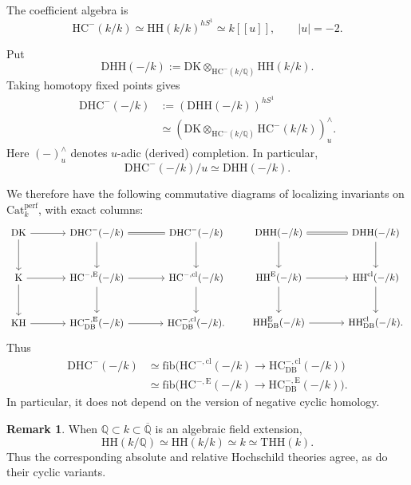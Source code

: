 \documentclass{amsart}
\theoremstyle{plain}
\theoremstyle{definition}
\newtheorem{remark}[prop]{Remark}
\newcommand{\bbQ}{\mathbb{Q}}
\newcommand{\Catperf}{\mathrm{Cat}^{\mathrm{perf}}}
\newcommand{\HH}{\mathrm{HH}}
\newcommand{\HC}{\mathrm{HC}}
\newcommand{\fib}{\mathrm{fib}}
\newcommand{\K}{\mathrm{K}}
\newcommand{\KH}{\mathrm{KH}}
\newcommand{\DK}{\mathrm{DK}}
\newcommand{\THH}{\mathrm{THH}}
\newcommand{\DHH}{\mathrm{DHH}}
\newcommand{\DHC}{\mathrm{DHC}}
\newcommand{\DB}{\mathrm{DB}}
\newcommand{\cl}{\mathrm{cl}}
\begin{document}
The coefficient algebra is
\[
\HC^-(k/k)\simeq \HH(k/k)^{hS^1}\simeq k[[u]],
\qquad |u|=-2.
\]


Put
\[
\DHH(-/k):=\DK\otimes_{\HC^-(k/\bbQ)}\HH(k/k).
\]
Taking homotopy fixed points gives
\begin{equation}\label{DHCcompletion}
\begin{aligned}
\DHC^-(-/k)
&:=(\DHH(-/k))^{hS^1}\\
&\simeq
(
\DK\otimes_{\HC^-(k/\bbQ)}\HC^-(k/k)
)^\wedge_u.
\end{aligned}
\end{equation}
Here $(-)^\wedge_u$ denotes $u$-adic (derived) completion. In particular,
\[
\DHC^-(-/k)/u\simeq \DHH(-/k).
\]

We therefore have the following commutative diagrams of localizing invariants on $\Catperf_k$, with exact columns:
\begin{equation}\label{negativecycliccorrectiondiagram}
\begin{gathered}
\begin{tikzcd}[column sep=large,row sep=large]
\DK\arrow[r]\arrow[d]
 &\DHC^-(-/k)\arrow[r,equal]\arrow[d]
 &\DHC^-(-/k)\arrow[d]\\
\K\arrow[r]\arrow[d]
 &\HC^{-,\mathrm{E}}(-/k)\arrow[r]\arrow[d]
 &\HC^{-,\cl}(-/k)\arrow[d]\\
\KH\arrow[r]
 &\HC^{-,\mathrm{E}}_{\DB}(-/k)\arrow[r]
 &\HC^{-,\cl}_{\DB}(-/k).
\end{tikzcd}
\qquad
\begin{tikzcd}[column sep=large,row sep=large]
\DHH(-/k)\arrow[r,equal]\arrow[d]
 &\DHH(-/k)\arrow[d]\\
\HH^{\mathrm{E}}(-/k)\arrow[r]\arrow[d]
 &\HH^{\cl}(-/k)\arrow[d]\\
\HH^{\mathrm{E}}_{\DB}(-/k)\arrow[r]
 &\HH^{\cl}_{\DB}(-/k).
\end{tikzcd}
\end{gathered}
\end{equation}
Thus
\[
\begin{aligned}
\DHC^-(-/k)
&\simeq
\fib\bigl(\HC^{-,\cl}(-/k)\longrightarrow \HC^{-,\cl}_{\DB}(-/k)\bigr)\\
&\simeq
\fib\bigl(\HC^{-,\mathrm{E}}(-/k)\longrightarrow \HC^{-,\mathrm{E}}_{\DB}(-/k)\bigr).
\end{aligned}
\]
In particular, it does not depend on the version of negative cyclic homology.

\begin{remark}
When $\bbQ\subset k\subset\overline{\bbQ}$ is an algebraic field extension,
\[
\HH(k/\bbQ)\simeq \HH(k/k)\simeq k\simeq \THH(k).
\]
Thus the corresponding absolute and relative Hochschild theories agree, as do their cyclic variants.
\end{remark}
\end{document}
